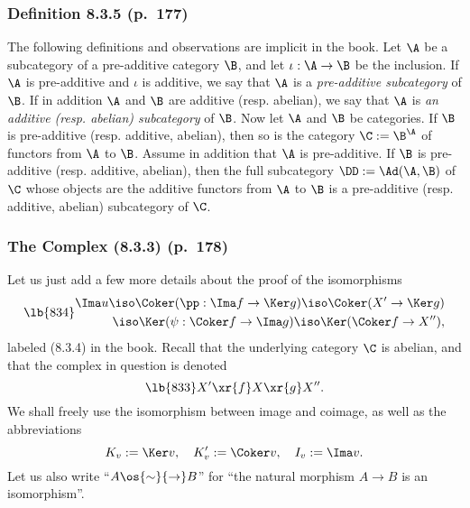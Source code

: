 \documentclass[12pt]{article}
\theoremstyle{remark}
\theoremstyle{definition}
\begin{document}

\subsubsection{Definition 8.3.5 (p.~177)}

The following definitions and observations are implicit in the book. Let $\A$ be a subcategory of a pre-additive category $\B$, and let $\iota:\A\to\B$ be the inclusion. If $\A$ is pre-additive and $\iota$ is additive, we say that $\A$ is a {\em pre-additive subcategory} of $\B$. If in addition $\A$ and $\B$ are additive (resp. abelian), we say that $\A$ is {\em an additive (resp. abelian) subcategory} of $\B$. Now let $\A$ and $\B$ be categories. If $\B$ is pre-additive (resp. additive, abelian), then so is the category $\C:=\B^\A$ of functors from $\A$ to $\B$. Assume in addition that $\A$ is pre-additive. If $\B$ is pre-additive (resp. additive, abelian), then the full subcategory $\DD:=\Ad(\A,\B)$ of $\C$ whose objects are the additive functors from $\A$ to $\B$ is a pre-additive (resp. additive, abelian) subcategory of $\C$.


\subsubsection{The Complex (8.3.3) (p.~178)}

Let us just add a few more details about the proof of the isomorphisms
\begin{equation}\lb{834}
\begin{split}
\Ima u\iso\Coker(\pp:\Ima f\to\Ker g)\iso\Coker(X'\to\Ker g)\\ 
\iso\Ker(\psi:\Coker f\to\Ima g)\iso\Ker(\Coker f\to X''),
\end{split}
\end{equation}
labeled (8.3.4) in the book. Recall that the underlying category $\C$ is abelian, and that the complex in question is denoted 
%
\begin{equation}\lb{833}
X'\xr{f}X\xr{g}X''.
\end{equation}
%  
We shall freely use the isomorphism between image and coimage, as well as the abbreviations 
$$
K_v:=\Ker v,\quad K'_v:=\Coker v,\quad I_v:=\Ima v.
$$ 
Let us also write ``$A\os{\sim}{\to}B$'' for ``the natural morphism $A\to B$ is an isomorphism''. 
\end{document}
